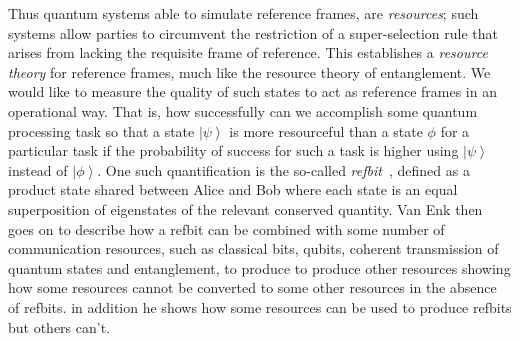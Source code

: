 \documentclass{article}
\newcommand{\ket}[1]{\left|#1\right\rangle}
\newcommand\defn[1]{\textsl{#1}}
\begin{document}
Thus quantum systems able to simulate reference frames, are \defn{resources}; such systems allow parties to circumvent the restriction of a super-selection rule that arises from lacking the requisite frame of reference.  This establishes a \defn{resource theory} for reference frames, much like the resource theory of entanglement.  We would like to measure the quality of such states to act as reference frames in an operational way.  That is, how successfully can we accomplish some quantum processing task so that a state $\ket{\psi}$ is more resourceful than a state $\phi$ for a particular task if the probability of success for such a task is higher using $\ket{\psi}$ instead of $\ket{\phi}$.   One such quantification is the so-called \defn{refbit}~\cite{vE05}, defined as a product state shared between Alice and Bob where each state is an equal superposition of eigenstates of the relevant conserved quantity.   Van Enk then goes on to describe how a refbit can be combined with some number of communication resources, such as classical bits, qubits, coherent transmission of quantum states and entanglement, to produce to produce other resources showing how some resources cannot be converted to some other resources in the absence of refbits.  in addition he shows how some resources can be used to produce refbits but others can't.










 

 



      

          



 
\end{document}
